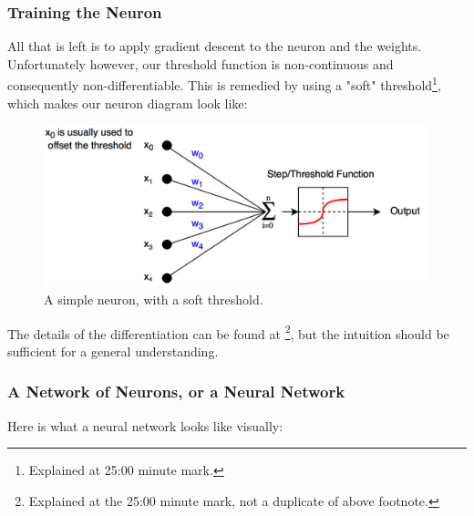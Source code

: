 \documentclass[a4paper, 12pt]{article}
\begin{document}
                        
                    \subsubsection{Training the Neuron}

                        \par All that is left is to apply gradient descent to the neuron and the weights. Unfortunately however, our threshold function is non-continuous and consequently non-differentiable. This is remedied by using a "soft" threshold\cite{mitNeuralNetwork}\footnote{Explained at 25:00 minute mark.}, which makes our neuron diagram look like:
                        
                         \begin{figure}[h]
                            \caption{A simple neuron, with a soft threshold.}
                            \centering
                            \includegraphics[width=\textwidth]{neuron2}
                        \end{figure}   
                        
                        \par The details of the differentiation can be found at \cite{logisticRegression}\footnote{Explained at the 25:00 minute mark, not a duplicate of above footnote.}, but the intuition should be sufficient for a general understanding.  
                        
                        \newpage
                        
                    \subsubsection{A Network of Neurons, or a Neural Network}                    
                    
                        \par Here is what a neural network looks like visually:
                        
\end{document}
